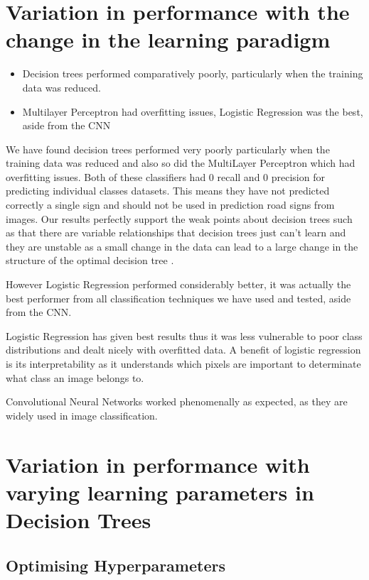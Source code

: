 \documentclass[11pt]{article}
\begin{document}
\newpage
\section{Variation in performance with the change in the learning paradigm}
\begin{itemize}
  \item Decision trees performed comparatively poorly, particularly when the training data was reduced.
  \item Multilayer Perceptron had overfitting issues, Logistic Regression was the best, aside from the CNN
\end{itemize}
We have found decision trees performed very poorly particularly when the training data was reduced and also so did the MultiLayer Perceptron which had overfitting issues. Both of these classifiers had 0 recall and 0 precision for predicting individual classes datasets. This means they have not predicted correctly a single sign and should not be used in prediction road signs from images. Our results perfectly support the weak points about decision trees such as that there are variable relationships that decision trees just can’t learn and they are unstable as a small change in the data can lead to a large change in the structure of the optimal decision tree \cite{zhaoComparisonDecisionTree2008}.
\par
However Logistic Regression performed considerably better, it was actually the best performer from all classification techniques we have used and tested, aside from the CNN. 
\par
Logistic Regression has given best results thus it was less vulnerable to poor class distributions and dealt nicely with overfitted data. A benefit of logistic regression is its interpretability as it understands which pixels are important to determinate what class an image belongs to.
\par
Convolutional Neural Networks worked phenomenally as expected, as they are widely used in image classification.


\newpage
\section{Variation in performance with varying learning parameters in Decision Trees}
\subsection{Optimising Hyperparameters}
\autocite{SklearnTreeDecisionTreeClassifier}
\end{document}
